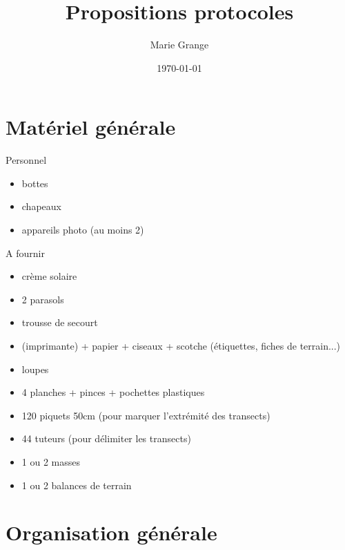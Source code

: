 \documentclass{article}
\author{Marie Grange}
\date{\today}
\title{Propositions protocoles}
\begin{document}
	\maketitle %
	\tableofcontents
	\pagebreak
	\section{Matériel générale}
	Personnel
	\begin{itemize}
		\item bottes
		\item chapeaux
		\item appareils photo (au moins 2)
	\end{itemize}
	A fournir
	\begin{itemize}
		\item crème solaire
		\item 2 parasols
		\item trousse de secourt
		\item (imprimante) + papier + ciseaux + scotche (étiquettes, fiches de terrain...)
		\item loupes
		\item 4 planches + pinces + pochettes plastiques
		\item 120 piquets 50cm (pour marquer l'extrémité des transects)
		\item 44 tuteurs (pour délimiter les transects)
		\item 1 ou 2 masses
		\item 1 ou 2 balances de terrain
	\end{itemize}

	\section{Organisation générale}
	
\end{document}
